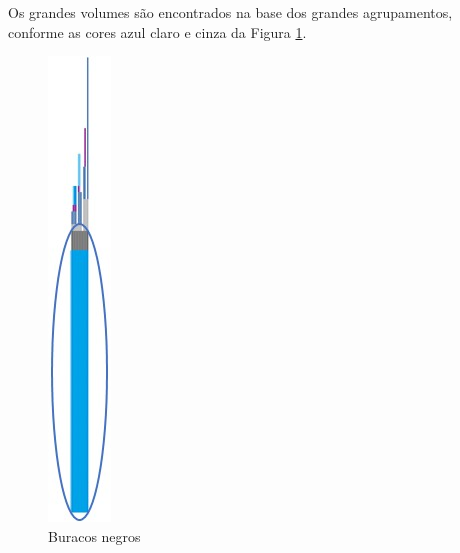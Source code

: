 Os grandes volumes são encontrados na base dos grandes agrupamentos, conforme as cores azul claro e cinza da Figura \ref{fig:consciousness_black_hole}.
	\begin{figure}[H]
	\caption{Buracos negros}
	\label{fig:consciousness_black_hole}
	\centering
	\includegraphics[scale=.6]{sections/images/consciousness_black_hole.jpg}
	\end{figure}
